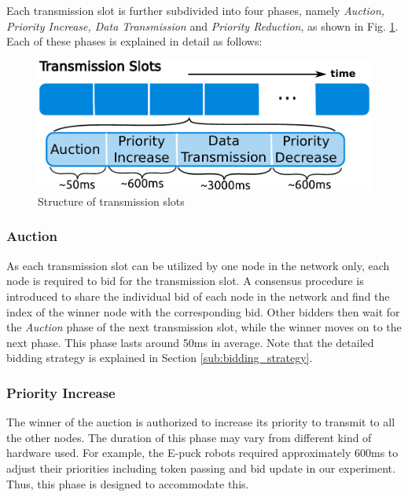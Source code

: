 \documentclass[journal]{IEEEtran}  %
\begin{document}
Each transmission slot is further subdivided into four phases, namely
\textit{Auction, Priority Increase, Data Transmission} and \textit{Priority
  Reduction}, as shown in Fig. \ref{fig:conduct_of_expt_0}.
Each of these phases is explained in detail as follows:
\begin{figure}[htpb]
\centering
\includegraphics[width=0.9\columnwidth]{Tex_Picts/strategy_slots} 
\caption{Structure of transmission slots}
\label{fig:conduct_of_expt_0}
\end{figure}

\subsubsection{Auction}
As each transmission slot can be utilized by one node in the network only, each
node is required to bid for the transmission slot. 
A consensus procedure is introduced to share the individual bid of each node in
the network and find the index of the winner node with the corresponding bid.  
Other bidders then wait for the \textit{Auction} phase of
the next transmission slot, while the winner moves on to the next phase.  
This phase lasts around 50ms in average.
Note that the detailed bidding strategy is explained in Section
\ref{sub:bidding_strategy}.

\subsubsection{Priority Increase}
The winner of the auction is authorized to increase its priority to transmit
to all the other nodes.
The duration of this phase may vary from different kind of hardware used.
For example, the E-puck robots required approximately 600ms to adjust their
priorities including token passing and bid update in our experiment. 
Thus, this phase is designed to accommodate this.
\end{document}
